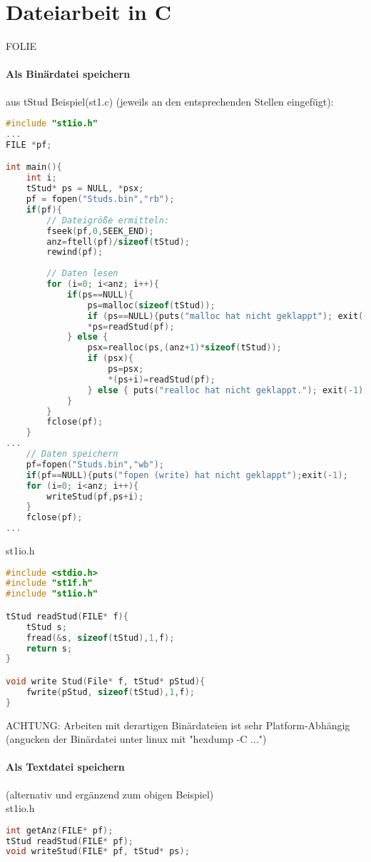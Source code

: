 \section{Dateiarbeit in C}
FOLIE
\paragraph{Als Binärdatei speichern}
aus tStud Beispiel(st1.c) (jeweils an den entsprechenden Stellen eingefügt):
\begin{lstlisting}[language=C]
#include "st1io.h"
...
FILE *pf;

int main(){
	int i;
	tStud* ps = NULL, *psx;
	pf = fopen("Studs.bin","rb");
	if(pf){
		// Dateigröße ermitteln:
		fseek(pf,0,SEEK_END);
		anz=ftell(pf)/sizeof(tStud);
		rewind(pf);
		
		// Daten lesen
		for (i=0; i<anz; i++){
			if(ps==NULL){
				ps=malloc(sizeof(tStud));
				if (ps==NULL){puts("malloc hat nicht geklappt"); exit(-1);}
				*ps=readStud(pf);
			} else {	
				psx=realloc(ps,(anz+1)*sizeof(tStud));
				if (psx){
					ps=psx;
					*(ps+i)=readStud(pf);
				} else { puts("realloc hat nicht geklappt."); exit(-1);}
			}
		}
		fclose(pf);
	}
...
	// Daten speichern
	pf=fopen("Studs.bin","wb");
	if(pf==NULL){puts("fopen (write) hat nicht geklappt");exit(-1);
	for (i=0; i<anz; i++){
		writeStud(pf,ps+i);
	}
	fclose(pf);
...
\end{lstlisting}

st1io.h
\begin{lstlisting}[language=C]
#include <stdio.h>
#include "st1f.h"
#include "st1io.h"

tStud readStud(FILE* f){
	tStud s;
	fread(&s, sizeof(tStud),1,f);
	return s;
}

void write Stud(File* f, tStud* pStud){
	fwrite(pStud, sizeof(tStud),1,f);
}
\end{lstlisting}
ACHTUNG: Arbeiten mit derartigen Binärdateien ist sehr Platform-Abhängig (angucken der Binärdatei unter linux mit "hexdump -C ...")

\paragraph{Als Textdatei speichern} (alternativ und ergänzend zum obigen Beispiel)\\
st1io.h
\begin{lstlisting}[language=C]
int getAnz(FILE* pf);
tStud readStud(FILE* pf);
void writeStud(FILE* pf, tStud* ps);
\end{lstlisting}

